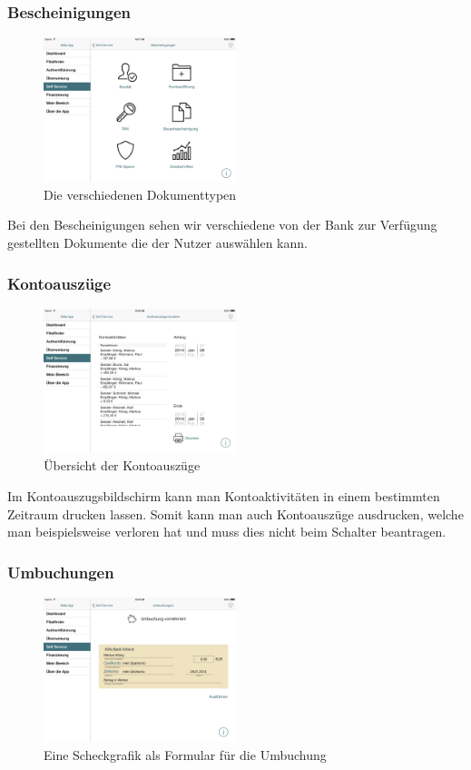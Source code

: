 \subsubsection{Bescheinigungen}
\begin{figure}[h]
	\centering
  \includegraphics[width=0.5\textwidth]{Pictures/Bescheinigungen}
	\caption{Die verschiedenen Dokumenttypen}
	\label{fig6}
\end{figure}

Bei den Bescheinigungen sehen wir verschiedene von der Bank zur Verfügung gestellten Dokumente die der Nutzer auswählen kann.

\subsubsection{Kontoauszüge}
\begin{figure}[h]
	\centering
  \includegraphics[width=0.5\textwidth]{Pictures/kontoauszuege}
	\caption{Übersicht der Kontoauszüge}
	\label{fig7}
\end{figure}

	Im Kontoauszugsbildschirm kann man Kontoaktivitäten in einem bestimmten Zeitraum drucken lassen. Somit kann man auch Kontoauszüge ausdrucken, welche man beispielsweise verloren hat und muss dies nicht beim Schalter beantragen.

\subsubsection{Umbuchungen}
\begin{figure}[h]
	\centering
  \includegraphics[width=0.5\textwidth]{Pictures/umbuchung}
	\caption{Eine Scheckgrafik als Formular für die Umbuchung}
	\label{fig8}
\end{figure}

